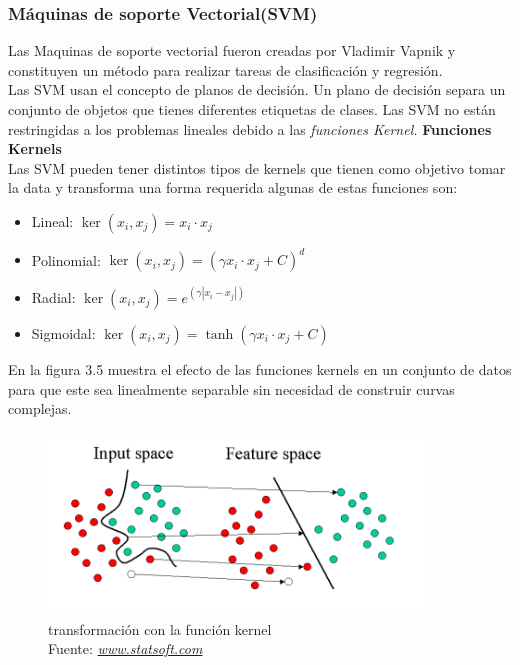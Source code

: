 \subsubsection*{Máquinas de soporte Vectorial(SVM)}
Las Maquinas de soporte vectorial fueron creadas por Vladimir Vapnik y constituyen un método para realizar tareas de clasificación y regresión.\\ Las SVM usan el concepto de planos de decisión. Un plano de decisión separa un conjunto de objetos que tienes diferentes etiquetas de clases. Las SVM no están restringidas a los problemas lineales debido a las \textit{funciones Kernel.}
\textbf{Funciones Kernels}\\
Las SVM pueden tener distintos tipos de kernels que tienen como objetivo tomar la data y transforma una forma requerida algunas de estas funciones son:
\begin{itemize}
	\item Lineal: $\ker(x_{i},x_{j})= x_{i} \cdot x_{j}$
	\item Polinomial: $\ker(x_{i},x_{j})= ( \gamma x_{i} \cdot x_{j}+C)^d$
	\item Radial: $\ker(x_{i},x_{j})= e^{(\gamma |x_{i} - x_{j}|)}$
	\item Sigmoidal: $\ker(x_{i},x_{j})= \tanh ( \gamma x_{i} \cdot x_{j}+C)$
\end{itemize}
En la figura 3.5 muestra el efecto de las funciones kernels en un conjunto de datos para que este sea linealmente separable sin necesidad de construir curvas complejas.\\
\begin{figure}[H]
	\centering
	\includegraphics[width=0.9\textwidth]{Figures/kernel.png}
	\caption{transformación con la función kernel \\ Fuente:  \href{http://www.statsoft.com/Textbook/Support-Vector-Machines}{\textit{www.statsoft.com}}}
	\label{transformación con la función kernel}
\end{figure} 

